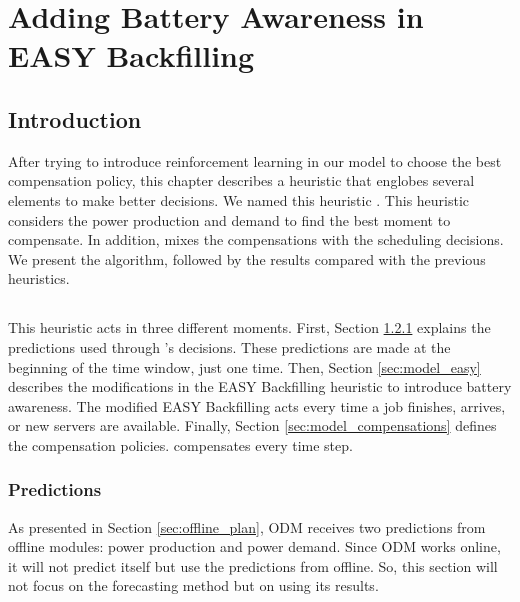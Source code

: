\chapter{Adding Battery Awareness in EASY Backfilling}
\label{cha:heuristic}

\minitoc

\section{Introduction}

After trying to introduce reinforcement learning in our model to choose the best compensation policy, this chapter describes a heuristic that englobes several elements to make better decisions. We named this heuristic \emph{\systemName}. This heuristic considers the power production and demand to find the best moment to compensate. In addition, \emph{\systemName} mixes the compensations with the scheduling decisions. We present the algorithm, followed by the results compared with the previous heuristics.

\section{\systemName}

This heuristic acts in three different moments. First, Section \ref{sec:model_predictions} explains the predictions used through \emph{\systemName}'s decisions. These predictions are made at the beginning of the time window, just one time. Then, Section \ref{sec:model_easy} describes the modifications in the EASY Backfilling heuristic to introduce battery awareness. The modified EASY Backfilling acts every time a job finishes, arrives, or new servers are available. Finally, Section \ref{sec:model_compensations} defines the compensation policies. \emph{\systemName} compensates every time step.

\subsection{Predictions}
\label{sec:model_predictions}

As presented in Section \ref{sec:offline_plan}, ODM receives two predictions from offline modules: power production and power demand. Since ODM works online, it will not predict itself but use the predictions from offline. So, this section will not focus on the forecasting method but on using its results.

